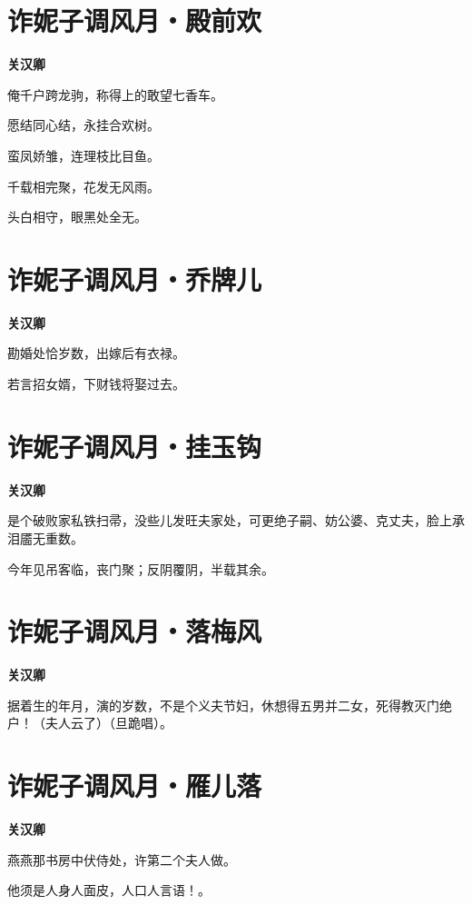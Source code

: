\documentclass[12pt,a4paper]{ctexbook}
\begin{document}
\section{诈妮子调风月・殿前欢}
\textbf{关汉卿}\par\vspace{0.5em}
俺千户跨龙驹，称得上的敢望七香车。\par
愿结同心结，永挂合欢树。\par
蛮凤娇雏，连理枝比目鱼。\par
千载相完聚，花发无风雨。\par
头白相守，眼黑处全无。\par

\section{诈妮子调风月・乔牌儿}
\textbf{关汉卿}\par\vspace{0.5em}
勘婚处恰岁数，出嫁后有衣禄。\par
若言招女婿，下财钱将娶过去。\par

\section{诈妮子调风月・挂玉钩}
\textbf{关汉卿}\par\vspace{0.5em}
是个破败家私铁扫帚，没些儿发旺夫家处，可更绝子嗣、妨公婆、克丈夫，脸上承泪靥无重数。\par
今年见吊客临，丧门聚；反阴覆阴，半载其余。\par

\section{诈妮子调风月・落梅风}
\textbf{关汉卿}\par\vspace{0.5em}
据着生的年月，演的岁数，不是个义夫节妇，休想得五男并二女，死得教灭门绝户！（夫人云了）（旦跪唱）。\par

\section{诈妮子调风月・雁儿落}
\textbf{关汉卿}\par\vspace{0.5em}
燕燕那书房中伏侍处，许第二个夫人做。\par
他须是人身人面皮，人口人言语！。\par
\end{document}
